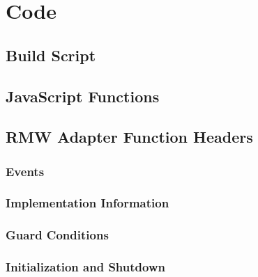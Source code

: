 \chapter{Code}

\section{Build Script}\label{sec:apxblasm}

    

\section{JavaScript Functions}\label{sec:apxmodule}

    

\section{RMW Adapter Function Headers}

    \subsection{Events}

        

    \subsection{Implementation Information}
        

        

        

        

    \subsection{Guard Conditions}

        

    \subsection{Initialization and Shutdown}

